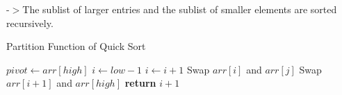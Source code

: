 \documentclass[twocolumn]{article}
\begin{document}
    -$>$The sublist of larger entries and the sublist of smaller elements are sorted recursively.\cite{5}
\vspace{20pt}
\begin{algorithm}
  \caption{Partition Function of Quick Sort}
  \begin{algorithmic}[1]
      \State $pivot \gets arr[high]$
      \State $i \gets low - 1$
              \State $i \gets i + 1$
              \State Swap $arr[i]$ and $arr[j]$
          \EndIf
      \EndFor
      \State Swap $arr[i + 1]$ and $arr[high]$ 
      \State \textbf{return} $i + 1$ 
  \EndProcedure
  \end{algorithmic}
  \end{algorithm}
  


\vspace{10pt}

\end{document}
